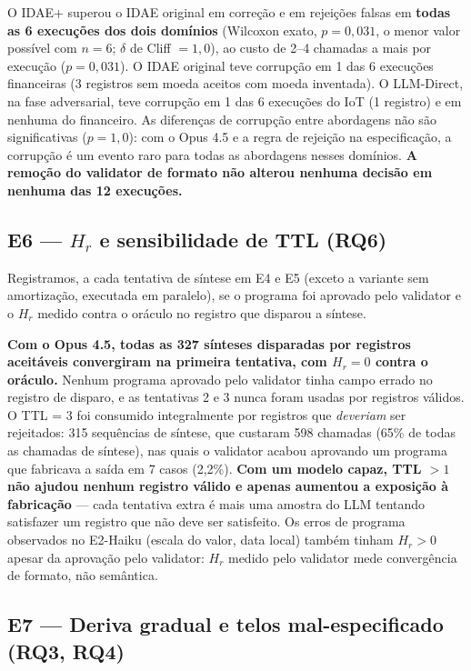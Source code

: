 \documentclass[sigconf,nonacm]{acmart}
\begin{document}
O IDAE+ superou o IDAE original em correção e em rejeições falsas em \textbf{todas as 6 execuções dos dois domínios} (Wilcoxon exato, $p = 0{,}031$, o menor valor possível com $n = 6$; $\delta$ de Cliff $= 1{,}0$), ao custo de 2--4 chamadas a mais por execução ($p = 0{,}031$). O IDAE original teve corrupção em 1 das 6 execuções financeiras (3 registros sem moeda aceitos com moeda inventada). O LLM-Direct, na fase adversarial, teve corrupção em 1 das 6 execuções do IoT (1 registro) e em nenhuma do financeiro. As diferenças de corrupção entre abordagens não são significativas ($p = 1{,}0$): com o Opus 4.5 e a regra de rejeição na especificação, a corrupção é um evento raro para todas as abordagens nesses domínios. \textbf{A remoção do validator de formato não alterou nenhuma decisão em nenhuma das 12 execuções.}

\subsection{E6 --- $H_r$ e sensibilidade de TTL (RQ6)}

Registramos, a cada tentativa de síntese em E4 e E5 (exceto a variante sem amortização, executada em paralelo), se o programa foi aprovado pelo validator e o $H_r$ medido contra o oráculo no registro que disparou a síntese.

\textbf{Com o Opus 4.5, todas as 327 sínteses disparadas por registros aceitáveis convergiram na primeira tentativa, com $H_r = 0$ contra o oráculo.} Nenhum programa aprovado pelo validator tinha campo errado no registro de disparo, e as tentativas 2 e 3 nunca foram usadas por registros válidos. O TTL = 3 foi consumido integralmente por registros que \textit{deveriam} ser rejeitados: 315 sequências de síntese, que custaram 598 chamadas (65\% de todas as chamadas de síntese), nas quais o validator acabou aprovando um programa que fabricava a saída em 7 casos (2,2\%). \textbf{Com um modelo capaz, TTL $> 1$ não ajudou nenhum registro válido e apenas aumentou a exposição à fabricação} --- cada tentativa extra é mais uma amostra do LLM tentando satisfazer um registro que não deve ser satisfeito. Os erros de programa observados no E2-Haiku (escala do valor, data local) também tinham $H_r > 0$ apesar da aprovação pelo validator: $H_r$ medido pelo validator mede convergência de formato, não semântica.

\subsection{E7 --- Deriva gradual e telos mal-especificado (RQ3, RQ4)}
\end{document}
